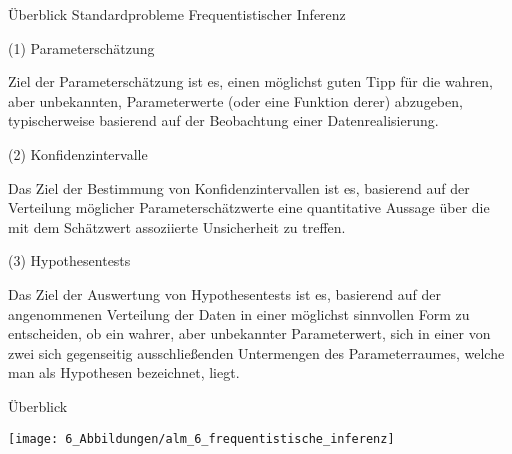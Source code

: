 \documentclass[
  8pt,
  ignorenonframetext,
]{beamer}
\begin{document}
\begin{frame}{Überblick}
\protect\hypertarget{uxfcberblick-2}{}
Standardprobleme Frequentistischer Inferenz \small

\noindent (1) Parameterschätzung

Ziel der Parameterschätzung ist es, einen möglichst guten Tipp für die
wahren, aber unbekannten, Parameterwerte (oder eine Funktion derer)
abzugeben, typischerweise basierend auf der Beobachtung einer
Datenrealisierung. \vspace{2mm}

\noindent (2) Konfidenzintervalle

Das Ziel der Bestimmung von Konfidenzintervallen ist es, basierend auf
der Verteilung möglicher Parameterschätzwerte eine quantitative Aussage
über die mit dem Schätzwert assoziierte Unsicherheit zu treffen.
\vspace{2mm}

\noindent (3) Hypothesentests

Das Ziel der Auswertung von Hypothesentests ist es, basierend auf der
angenommenen Verteilung der Daten in einer möglichst sinnvollen Form zu
entscheiden, ob ein wahrer, aber unbekannter Parameterwert, sich in
einer von zwei sich gegenseitig ausschließenden Untermengen des
Parameterraumes, welche man als Hypothesen bezeichnet, liegt.
\end{frame}

\begin{frame}{Überblick}
\protect\hypertarget{uxfcberblick-3}{}
\begin{center}\texttt{[image: 6\_Abbildungen/alm\_6\_frequentistische\_inferenz]} \end{center}
\end{frame}
\end{document}
